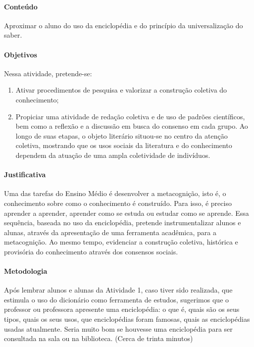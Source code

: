 \documentclass[12pt]{extarticle}
\begin{document}
\paragraph{Conteúdo} Aproximar o aluno do uso da enciclopédia e do princípio da universalização do saber.

\paragraph{Objetivos}
Nessa atividade, pretende-se:
\begin{enumerate} 
\item
Ativar procedimentos de pesquisa e
valorizar a construção coletiva do conhecimento; 

\item
Propiciar uma atividade de redação coletiva e de uso de padrões científicos, bem como a reflexão e a discussão em busca do consenso em cada grupo. Ao longo de
suas etapas, o objeto literário situou-se no centro da atenção coletiva,
mostrando que os usos sociais da literatura e do conhecimento dependem
da atuação de uma ampla coletividade de indivíduos.
\end{enumerate}

\paragraph{Justificativa}
Uma das tarefas do Ensino Médio é desenvolver a metacognição, isto é, o
conhecimento sobre como o conhecimento é construído. Para isso, é
preciso aprender a aprender, aprender como se estuda ou estudar como se
aprende. Essa sequência, baseada no uso da enciclopédia, pretende
instrumentalizar alunos e alunas, através da apresentação de uma
ferramenta acadêmica, para a metacognição. Ao mesmo tempo, evidenciar a
construção coletiva, histórica e provisória do conhecimento através dos
consensos sociais.

\paragraph{Metodologia}
Após lembrar alunos e alunas da Atividade 1, caso tiver sido realizada,
que estimula o uso do dicionário como ferramenta de estudos, sugerimos
que o professor ou professora apresente uma enciclopédia: o que é, quais
são os seus tipos, quais os seus usos, que enciclopédias foram famosas,
quais as enciclopédias usadas atualmente. Seria muito bom se houvesse
uma enciclopédia para ser consultada na sala ou na biblioteca. (Cerca de
trinta minutos)
\end{document}
